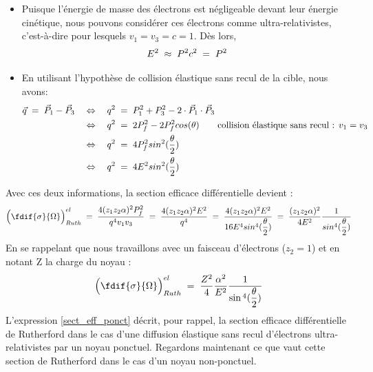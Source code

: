 \begin{itemize}[label=$\bullet$]

    \item Puisque l'énergie de masse des électrons est négligeable devant leur énergie cinétique, nous pouvons considérer ces électrons comme ultra-relativistes, c'est-à-dire pour lesquels $v_1=v_3=c=1$. Dès lors,
    \begin{equation*}
        E^2 \;\approx\; P^2c^2 \; = \; P^2
    \end{equation*}
    
    \item En utilisant l'hypothèse de collision élastique sans recul de la cible, nous avons:
    \begin{align*}
        \vec{q} \; = \; \vec{P}_1 - \vec{P}_3
            &\quad \Leftrightarrow \quad
        q^2 \; = \; P_1^2 + P_3^2 - 2 \cdot \vec{P}_1 \cdot \vec{P}_3\\
            &\quad \Leftrightarrow \quad
        q^2 \; = \; 2 P_f^2 - 2 P_f^2 cos(\theta)
        \qquad \text{collision élastique sans recul : } v_1=v_3\\
            &\quad \Leftrightarrow \quad
        q^2 \; = \; 4 P_f^2 sin^2(\dfrac{\theta}{2})\\
            &\quad \Leftrightarrow \quad
        q^2 \; = \; 4 E^2   sin^2(\dfrac{\theta}{2})
    \end{align*}
\end{itemize}
Avec ces deux informations, la section efficace différentielle devient :
\begin{equation*}
    \Big(  \fdif{\sigma}{\Omega}  \Big)^{el}_{Ruth}
    \eq
    \dfrac{4 (z_1 z_2 \alpha)^2 P_f^2}{q^4v_1v_3}
    \eq
    \dfrac{4 (z_1 z_2 \alpha)^2 E^2}{q^4}
    \eq
    \dfrac{4 (z_1 z_2 \alpha)^2 E^2}{16 E^4 sin^4(\dfrac{\theta}{2})}
    \eq
    \dfrac{(z_1 z_2 \alpha)^2}{4E^2}
    \dfrac{1}{sin^4(\dfrac{\theta}{2})}
\end{equation*}
En se rappelant que nous travaillons avec un faisceau d'électrons ($z_2 = 1$) et en notant Z la charge du noyau : 
\begin{equation}
    \Big(  \fdif{\sigma}{\Omega}  \Big)^{el}_{Ruth}
    \eq
    \dfrac{Z^2}{4}\dfrac{\alpha^2}{E^2}\dfrac{1}{\sin{^4(\dfrac{\theta}{2})}}
    \label{sect_eff_ponct}
\end{equation}
L'expression \ref{sect_eff_ponct} décrit, pour rappel, la section efficace différentielle de Rutherford dans le cas d'une diffusion élastique sans recul d'électrons ultra-relativistes par un noyau ponctuel. Regardons maintenant ce que vaut cette section de Rutherford dans le cas d'un noyau non-ponctuel.


